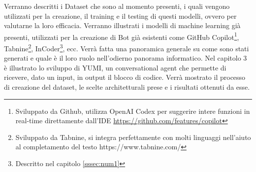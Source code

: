Verranno descritti i Dataset che sono al momento presenti, i quali vengono utilizzati per la creazione, il training e il testing di questi modelli, ovvero per valutarne la loro efficacia. Verranno illustrati i modelli di machine learning già presenti, utilizzati per la creazione di Bot già esistenti come GitHub Copilot\footnote{Sviluppato da Github, utilizza OpenAI Codex per suggerire intere funzioni in real-time direttamente dall'IDE \url{https://github.com/features/copilot}}, Tabnine\footnote{Sviluppato da Tabnine, si integra perfettamente con molti linguaggi nell'aiuto al completamento del testo https://www.tabnine.com/}, InCoder\footnote{Descritto nel capitolo \ref{sssec:num1}}, ecc.
Verrà fatta una panoramica generale su come sono stati generati e quale è il loro ruolo nell'odierno panorama informatico.
Nel capitolo 3 è illustrato lo sviluppo di YUMI, un conversational agent che permette di ricevere, dato un input, in output il blocco di codice.
Verrà mostrato il processo di creazione del dataset, le scelte architetturali prese e i risultati ottenuti da esse.